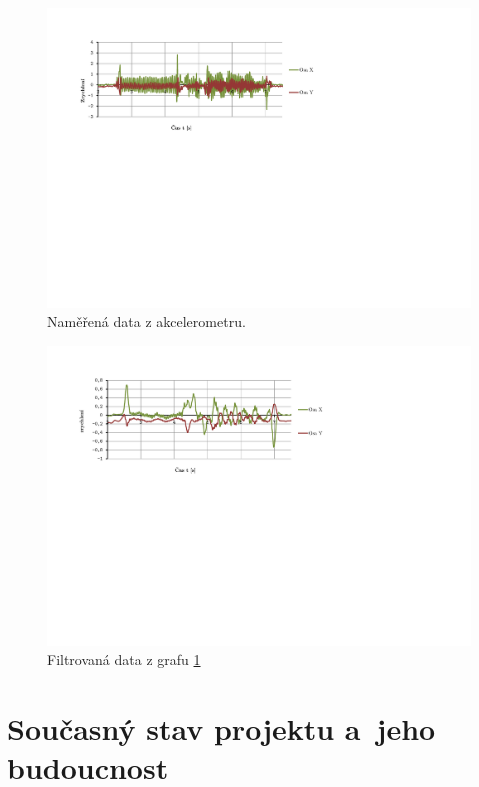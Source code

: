 	\begin{figure}[h]	
			\centering
			\includegraphics[width=\textwidth]{img/nefiltrovane2.pdf}
			\caption{Naměřená data z akcelerometru.}\label{graf:nefiltr2}	
		\end{figure}
		
		\begin{figure}[h]	
			\centering
			\includegraphics[width=\textwidth]{img/filtrovane2.pdf}
			\caption{Filtrovaná data z grafu \ref{graf:nefiltr2}}\label{graf:filtr2}	
		\end{figure}
	
\chapter{Současný stav projektu a~jeho budoucnost}

